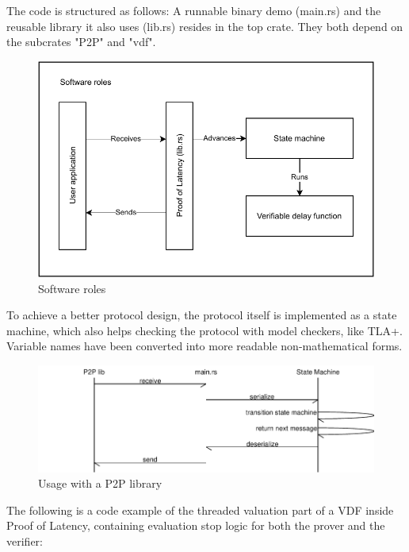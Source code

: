 The code is structured as follows: A runnable binary demo (main.rs) and the reusable library it also uses (lib.rs) resides in the top crate. They both depend on the subcrates "P2P" and "vdf".

\begin{figure}
	\includegraphics[width=\textwidth]{pictures/PoL_software_roles.pdf}
	\caption{Software roles}
	\label{software_roles}
\end{figure}

To achieve a better protocol design, the protocol itself is implemented as a state machine, which also helps checking the protocol with model checkers, like TLA+. Variable names have been converted into more readable non-mathematical forms.

\begin{figure}
	\includegraphics[width=\textwidth]{pictures/message_flow-eps-converted-to.pdf}
	\caption{Usage with a P2P library}
	\label{message_flow}
\end{figure}

The following is a code example of the threaded valuation part of a VDF inside Proof of Latency, containing evaluation stop logic for both the prover and the verifier:



